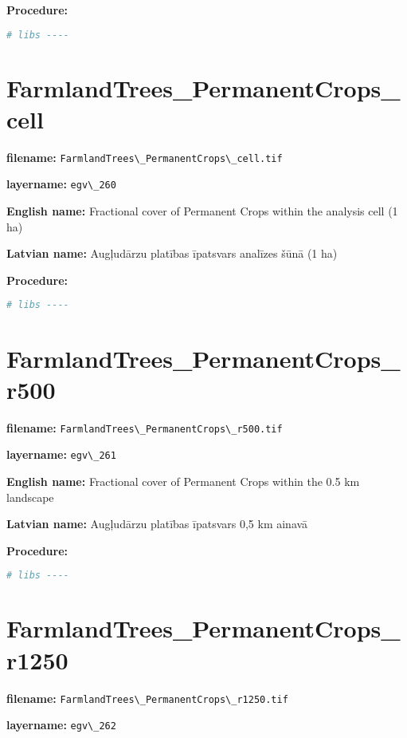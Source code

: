 \documentclass[
]{book}
\newcommand{\passthrough}[1]{#1}
\begin{document}
\textbf{Procedure:}

\begin{lstlisting}[language=R]
# libs ----
\end{lstlisting}

\section{FarmlandTrees\_PermanentCrops\_cell}\label{ch06.260}

\textbf{filename:} \passthrough{\lstinline!FarmlandTrees\_PermanentCrops\_cell.tif!}

\textbf{layername:} \passthrough{\lstinline!egv\_260!}

\textbf{English name:} Fractional cover of Permanent Crops within the analysis cell (1 ha)

\textbf{Latvian name:} Augļudārzu platības īpatsvars analīzes šūnā (1 ha)

\textbf{Procedure:}

\begin{lstlisting}[language=R]
# libs ----
\end{lstlisting}

\section{FarmlandTrees\_PermanentCrops\_r500}\label{ch06.261}

\textbf{filename:} \passthrough{\lstinline!FarmlandTrees\_PermanentCrops\_r500.tif!}

\textbf{layername:} \passthrough{\lstinline!egv\_261!}

\textbf{English name:} Fractional cover of Permanent Crops within the 0.5 km landscape

\textbf{Latvian name:} Augļudārzu platības īpatsvars 0,5 km ainavā

\textbf{Procedure:}

\begin{lstlisting}[language=R]
# libs ----
\end{lstlisting}

\section{FarmlandTrees\_PermanentCrops\_r1250}\label{ch06.262}

\textbf{filename:} \passthrough{\lstinline!FarmlandTrees\_PermanentCrops\_r1250.tif!}

\textbf{layername:} \passthrough{\lstinline!egv\_262!}
\end{document}
